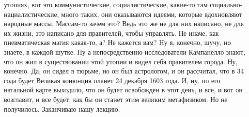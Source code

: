 утопиях, вот это коммунистические, социалистические, какие-то там социально-
нациалистические, много таких, они оказываются идеями, которые вдохновляют
народные массы. Массам-то зачем это? Ведь это же не для них написано, не для их
жизни, это написано для правителей, чтобы управлять. Не иначе, как
пневматическая магия какая-то, а? Не кажется вам? Ну я, конечно, шучу, но
знаете, в каждой шутке. Ну а непосредственно исследователи Кампанелло знают, что
он жил в существовании этой утопии и видел себя правителем города. Ну, конечно.
Да, он сидел в тюрьме, но он был астрологом, и он рассчитал, что в 34 года будет
Великая конюнция планет 24 декабря 1603 года. И, ну, по его натальной карте
выходило, что он будет освобожден в этот день, и все, и вот он возглавит, и все
будет, как бы он станет этим великим метафизиком. Но не получилось. Заканчиваю
нашу лекцию. 
